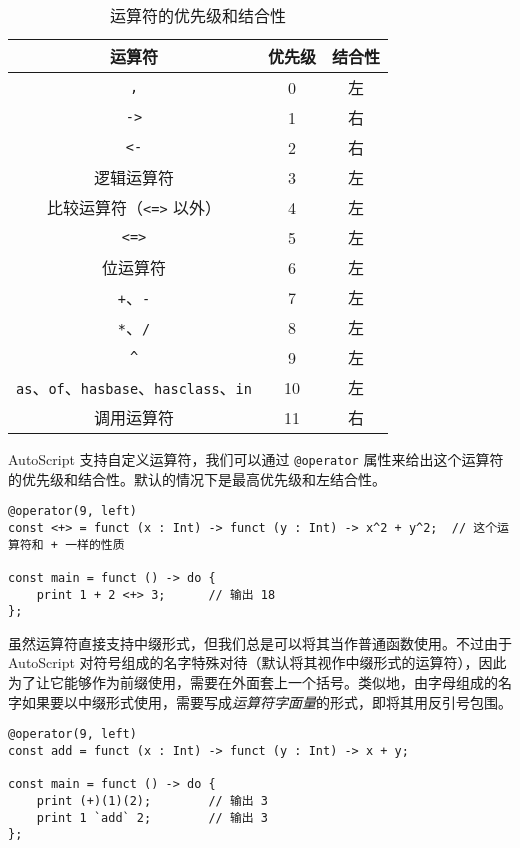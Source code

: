 \begin{table}[h]
    \centering
    \begin{tabular}{|c|c|c|} \hline
        运算符 & 优先级 & 结合性 \\\hline
        \lstinline!,! & 0 & 左 \\\hline
        \lstinline!->! & 1 & 右 \\\hline
        \lstinline!<-! & 2 & 右 \\\hline
        逻辑运算符 & 3 & 左 \\\hline
        比较运算符（\lstinline!<=>! 以外） & 4 & 左 \\\hline
        \lstinline!<=>! & 5 & 左 \\\hline
        位运算符 & 6 & 左 \\\hline
        \lstinline!+!、\lstinline!-! & 7 & 左 \\\hline
        \lstinline!*!、\lstinline!/! & 8 & 左 \\\hline
        \lstinline!^! & 9 & 左 \\\hline
        \lstinline!as!、\lstinline!of!、\lstinline!hasbase!、\lstinline!hasclass!、\lstinline!in! & 10 & 左 \\\hline
        调用运算符 & 11 & 右 \\\hline
    \end{tabular}
    \caption{运算符的优先级和结合性}
    \label{tab:operators}
\end{table}

AutoScript 支持自定义运算符，我们可以通过 \lstinline!@operator! 属性来给出这个运算符的优先级和结合性。默认的情况下是最高优先级和左结合性。

\begin{lstlisting}
@operator(9, left)
const <+> = funct (x : Int) -> funct (y : Int) -> x^2 + y^2;  // 这个运算符和 + 一样的性质

const main = funct () -> do {
    print 1 + 2 <+> 3;      // 输出 18
};
\end{lstlisting}

虽然运算符直接支持中缀形式，但我们总是可以将其当作普通函数使用。不过由于 AutoScript 对符号组成的名字特殊对待（默认将其视作中缀形式的运算符），因此为了让它能够作为前缀使用，需要在外面套上一个括号。类似地，由字母组成的名字如果要以中缀形式使用，需要写成\emph{运算符字面量}的形式，即将其用反引号包围。

\begin{lstlisting}
@operator(9, left)
const add = funct (x : Int) -> funct (y : Int) -> x + y;

const main = funct () -> do {
    print (+)(1)(2);        // 输出 3
    print 1 `add` 2;        // 输出 3
};
\end{lstlisting}

